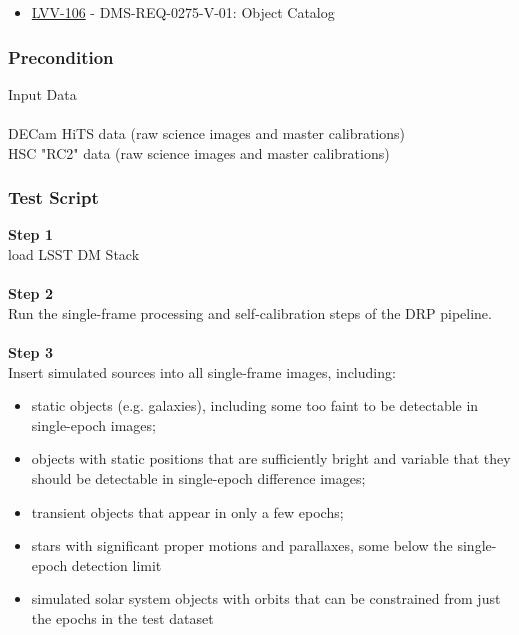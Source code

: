 \begin{itemize}
\tightlist
\item
  \href{https://jira.lsstcorp.org/browse/LVV-106}{LVV-106} -
  DMS-REQ-0275-V-01: Object Catalog
\end{itemize}

\hypertarget{precondition-4}{%
\subsubsection{Precondition}\label{precondition-4}}

Input Data\\
~\\
DECam HiTS data (raw science images and master calibrations)\\
HSC "RC2" data (raw science images and master calibrations)

\hypertarget{test-script-44}{%
\subsubsection{Test Script}\label{test-script-44}}

\textbf{Step 1}\\
load LSST DM Stack\\
~\\
\textbf{Step 2}\\
Run the single-frame processing and self-calibration steps of the DRP
pipeline.~\\
~\\
\textbf{Step 3}\\
Insert simulated sources into all single-frame images, including:

\begin{itemize}
\tightlist
\item
  static objects (e.g. galaxies), including some too faint to be
  detectable in single-epoch images;
\item
  objects with static positions that are sufficiently bright and
  variable that they should be detectable in single-epoch difference
  images;
\item
  transient objects that appear in only a few epochs;
\item
  stars with significant proper motions and parallaxes, some below the
  single-epoch detection limit
\item
  simulated solar system objects with orbits that can be constrained
  from just the epochs in the test dataset
\end{itemize}

